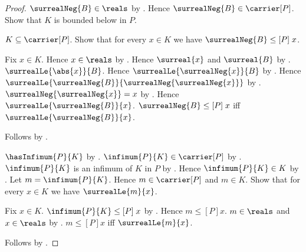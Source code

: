 \begin{proof}
    $\surrealNeg{B}\in\reals$ by
        .
    Hence $\surrealNeg{B}\in\carrier[P]$.
    Show that $K$ is bounded below in $P$.
    \begin{subproof}
        $K\subseteq\carrier[P]$.
        Show that for every $x\in K$ we have
            $\surrealNeg{B}\mathrel{\leq[P]}x$.
        \begin{subproof}
            Fix $x\in K$.
            Hence $x\in\reals$ by .
            Hence $\surreal{x}$ and $\surreal{B}$ by
                .
            $\surrealLe{\abs{x}}{B}$.
            Hence $\surrealLe{\surrealNeg{x}}{B}$ by
                .
            Hence $\surrealLe{\surrealNeg{B}}
                {\surrealNeg{\surrealNeg{x}}}$ by
                .
            $\surrealNeg{\surrealNeg{x}}=x$ by
                .
            Hence $\surrealLe{\surrealNeg{B}}{x}$.
            $\surrealNeg{B}\mathrel{\leq[P]}x$ iff
                $\surrealLe{\surrealNeg{B}}{x}$.
        \end{subproof}
        Follows by .
    \end{subproof}
    $\hasInfimum{P}{K}$ by .
    $\infimum{P}{K}\in\carrier[P]$ by .
    $\infimum{P}{K}$ is an infimum of $K$ in $P$ by
        .
    Hence $\infimum{P}{K}\in K$ by
        .
    Let $m=\infimum{P}{K}$.
    Hence $m\in\carrier[P]$ and $m\in K$.
    Show that for every $x\in K$ we have $\surrealLe{m}{x}$.
    \begin{subproof}
        Fix $x\in K$.
        $\infimum{P}{K}\mathrel{\leq[P]}x$ by
            .
        Hence $m\mathrel{\leq[P]}x$.
        $m\in\reals$ and $x\in\reals$ by .
        $m\mathrel{\leq[P]}x$ iff $\surrealLe{m}{x}$.
    \end{subproof}
    Follows by \auto.
\end{proof}

